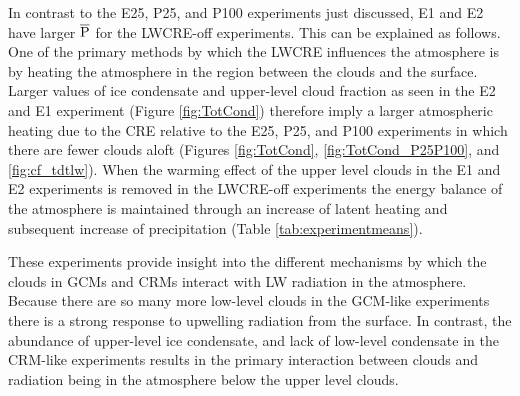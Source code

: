 \documentclass[draft]{agujournal2019}
\begin{document}
{In contrast to the E25, P25, and P100 experiments just discussed, 
E1 and E2 have larger $\overline{\rm{P}}$ for the LWCRE-off experiments.  This can be explained as follows.  
One of the primary methods by which the LWCRE influences the atmosphere is by 
heating the atmosphere in the region between the clouds and the surface.  
Larger values of ice condensate and upper-level cloud fraction as seen in the E2 and E1 experiment 
(Figure \ref{fig:TotCond}) therefore imply a larger atmospheric heating due to the CRE relative to the 
E25, P25, and P100 experiments in which there are fewer clouds aloft (Figures \ref{fig:TotCond}, 
\ref{fig:TotCond_P25P100}, and \ref{fig:cf_tdtlw}).  When the warming effect of the upper level clouds 
in the E1 and E2 experiments is removed in the LWCRE-off experiments the energy balance of 
the atmosphere is maintained through an increase of latent heating and subsequent increase 
of precipitation (Table \ref{tab:experimentmeans}).  

These experiments provide insight into the different mechanisms by which the clouds in GCMs and CRMs
interact with LW radiation in the atmosphere.  Because there are so many more low-level clouds in 
the GCM-like experiments there is a strong response to upwelling radiation from the surface.  In contrast, 
the abundance of upper-level ice condensate, and lack of low-level condensate in the CRM-like experiments 
results in the primary interaction between clouds and radiation being in the atmosphere below the upper level clouds.       

%




}
\end{document}
